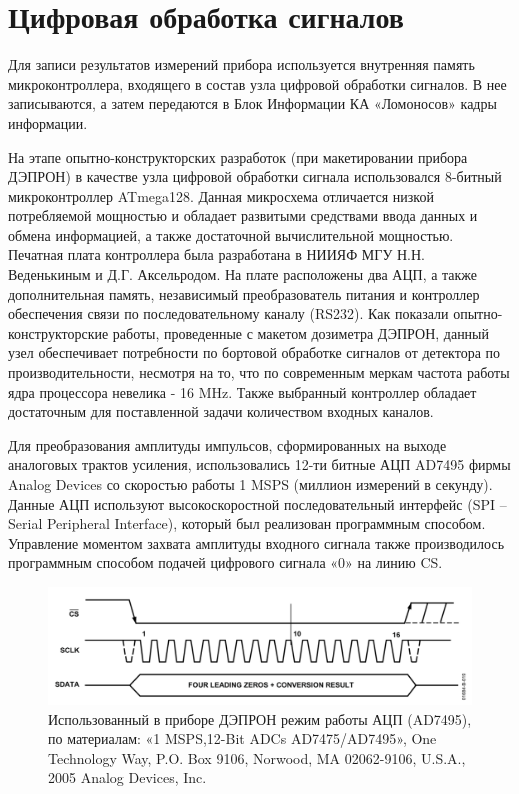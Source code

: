 \section{Цифровая обработка сигналов}

Для записи результатов измерений прибора используется внутренняя память микроконтроллера, входящего в состав узла цифровой обработки сигналов. В нее записываются, а затем передаются в Блок Информации КА «Ломоносов» кадры информации.

На этапе опытно-конструкторских разработок (при макетировании прибора ДЭПРОН) в качестве узла цифровой обработки сигнала использовался 8-битный микроконтроллер ATmega128. Данная микросхема отличается низкой потребляемой мощностью и обладает развитыми средствами ввода данных и обмена информацией, а также достаточной вычислительной мощностью. Печатная плата контроллера была разработана в  НИИЯФ МГУ Н.Н. Веденькиным и Д.Г. Аксельродом. На плате расположены два АЦП, а также дополнительная память, независимый преобразователь питания и контроллер обеспечения связи по последовательному каналу (RS232). Как показали опытно-конструкторские работы, проведенные с макетом дозиметра ДЭПРОН, данный узел обеспечивает потребности по бортовой обработке сигналов от детектора по производительности, несмотря на то, что по современным меркам частота работы ядра процессора невелика - 16 MHz. Также выбранный контроллер обладает достаточным для поставленной задачи количеством входных каналов.

Для преобразования амплитуды импульсов, сформированных на выходе аналоговых трактов усиления, использовались 12-ти битные АЦП AD7495 фирмы Analog Devices со скоростью работы 1 MSPS (миллион измерений в секунду). Данные АЦП используют высокоскоростной последовательный интерфейс (SPI -- Serial Peripheral Interface), который был реализован программным способом. Управление моментом захвата амплитуды входного сигнала также производилось программным способом подачей цифрового сигнала «0» на линию CS. 
\begin{figure}
	\centering
	\includegraphics[width=0.7\linewidth]{images/adc}
	\caption{Использованный в приборе ДЭПРОН режим работы АЦП (AD7495), по материалам:  «1 MSPS,12-Bit ADCs  AD7475/AD7495», One Technology Way, P.O. Box 9106, Norwood, MA 02062-9106, U.S.A., 2005 Analog Devices, Inc.}
	\label{fig:adc}
\end{figure}

